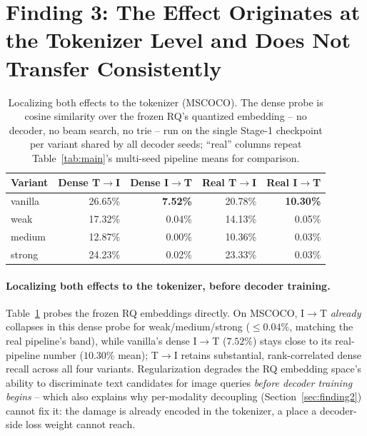 \section{Finding 3: The Effect Originates at the Tokenizer Level and Does Not Transfer Consistently}
\label{sec:finding3}

\begin{table}[t]
\centering
\caption{Localizing both effects to the tokenizer (MSCOCO). The dense probe is cosine similarity over the frozen RQ's quantized embedding -- no decoder, no beam search, no trie -- run on the single Stage-1 checkpoint per variant shared by all decoder seeds; ``real'' columns repeat Table~\ref{tab:main}'s multi-seed pipeline means for comparison.}
\label{tab:localization}
\footnotesize
\begin{tabular}{@{}lrrrr@{}}
\toprule
Variant & Dense T$\to$I & Dense I$\to$T & Real T$\to$I & Real I$\to$T \\
\midrule
vanilla & 26.65\% & \textbf{7.52\%} & 20.78\% & \textbf{10.30\%} \\
weak    & 17.32\% & 0.04\% & 14.13\% & 0.05\% \\
medium  & 12.87\% & 0.00\% & 10.36\% & 0.03\% \\
strong  & 24.23\% & 0.02\% & 23.33\% & 0.03\% \\
\bottomrule
\end{tabular}
\end{table}

\paragraph{Localizing both effects to the tokenizer, before decoder training.} Table~\ref{tab:localization} probes the frozen RQ embeddings directly. On MSCOCO, I$\to$T \emph{already} collapses in this dense probe for weak/medium/strong ($\leq0.04\%$, matching the real pipeline's band), while vanilla's dense I$\to$T ($7.52\%$) stays close to its real-pipeline number ($10.30\%$ mean); T$\to$I retains substantial, rank-correlated dense recall across all four variants. Regularization degrades the RQ embedding space's ability to discriminate text candidates for image queries \emph{before decoder training begins} -- which also explains why per-modality decoupling (Section~\ref{sec:finding2}) cannot fix it: the damage is already encoded in the tokenizer, a place a decoder-side loss weight cannot reach.

